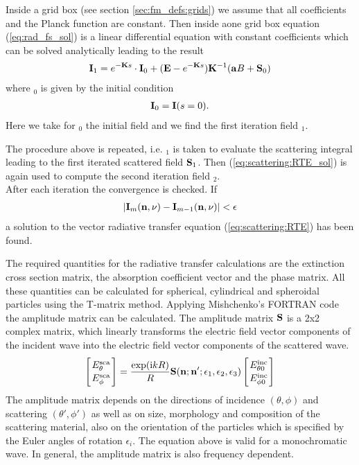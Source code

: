 Inside a  grid box (see section
\ref{sec:fm_defs:grids}) we assume that all
coefficients and the Planck function are constant. Then inside aone
grid box equation (\ref{eq:rad_fs_sol}) is a linear differential
equation with constant coefficients which can be solved analytically
leading to the result  
\begin{eqnarray}
  \label{eq:scattering:RTE_sol}
  {\bf I}_1 = e^{-{\bf K} s}\cdot{\bf I}_0 + ({\bf E} - e^{-{\bf K}
    s}) {\bf K}^{-1} ({\bf a} B + {\bf S}_0)
\end{eqnarray}
where \StoVec$_0$ is given by the initial condition
\begin{eqnarray}
  {\bf I}_0 =  {\bf I}(s = 0).
\end{eqnarray}
Here we take for \StoVec$_0$ the initial field and we find the first
iteration field \StoVec$_1$.

\label{sec:scattering:conv}

The procedure above is repeated, i.e. \StoVec$_1$ is taken to evaluate
the scattering integral leading to the first iterated scattered field
${\bf S}_1$. Then (\ref{eq:scattering:RTE_sol}) is again used to compute the
second iteration field \StoVec$_2$. \\
After each iteration the convergence is checked. If 
\begin{eqnarray}
|{\bf I}_m ({\bf n}, \nu) -  {\bf I}_{m-1} ({\bf n}, \nu)| < {\bf \epsilon}
\end{eqnarray}
a solution to the vector radiative transfer equation (\ref{eq:scattering:RTE})
has been
found.

\label{sec:scattering:database}

The required quantities for the radiative transfer calculations are
the  extinction cross section matrix, the
absorption coefficient vector and the phase
matrix. All these quantities can be calculated for spherical,
cylindrical and spheroidal particles using the T-matrix
method. Applying Mishchenko's FORTRAN code%
the amplitude matrix can be calculated. The
amplitude matrix ${\bf S}$ is a 2x2 complex matrix, which linearly transforms 
the electric field vector components of the incident wave into the
electric field vector components of the scattered wave.  
\begin{eqnarray}
  \label{eq:ampl_matrix}
  \left[{E^{\rm sca}_{\theta}\atop E^{\rm sca}_{\phi}}\right] =
  \frac{\exp({\rm i} kR)}{R}{\bf S}({\bf n};{\bf
      n'};\epsilon_1,\epsilon_2,\epsilon_3)\left[{E^{\rm inc}_{\theta
          0}\atop E^{\rm inc}_{\phi 0}}\right] 
\end{eqnarray}
The amplitude matrix depends on the directions of incidence  $(\theta,
\phi)$  and
scattering $(\theta', \phi')$ as  well as on size, morphology and composition of the
scattering material, also on the orientation of the particles which
is specified by the Euler angles of rotation $\epsilon _i$. 
The equation above is valid for a monochromatic wave. In general, the
amplitude matrix is also frequency dependent.

